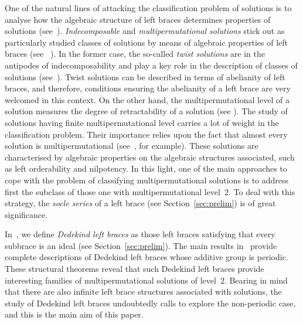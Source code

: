 \documentclass[12pt, a4paper, english]{article}
\theoremstyle{definition}
\begin{document}
One of the natural lines of attacking the classification problem of solutions is to analyse how the algebraic structure of left braces determines properties of solutions (see~\cite{Rump07}). \emph{Indecomposable} and \emph{multipermutational solutions}  stick out as particularly studied classes of solutions by means of algebraic properties of left braces (see ~\cite{CedoJespersOkninski10, CedoJespersOkninski14, CedoOkninski23, Gateva-IvanovaCameron12, Gateva-Ivanova18-advmath, JedlickaPilitowska23, Smoktunowicz18-tams}). In the former case, the so-called \emph{twist solutions} are in the antipodes of indecomposability and play a key role in the description of classes of solutions (see~\cite{BachillerCedoJespersOkninski19, BallesterEstebanJimenezPerezC24-solubleskewbraces}). Twist solutions can be described in terms of abelianity of left braces, and therefore, conditions ensuring the abelianity of a left brace are very welcomed in this context. On the other hand, the multipermutational level of a solution measures the degree of retractability of a solution (see \cite{EtingofSchedlerSoloviev99}). The study of solutions having finite multipermutational level carries a lot of weight in the classification problem. Their importance relies upon the fact that almost every solution is multipermutational (see~\cite{JespersVanAntwerpenVendramin23}, for example). These solutions are characterised by algebraic properties on the algebraic structures associated, such as left orderability and nilpotency. In this light, one of the main approaches to cope with the problem of classifying multipermutational solutions is to address first the subclass of those one with multipermutational level~$2$. To deal with this strategy, the \emph{socle series} of a left brace (see Section~\ref{sec:prelim}) is of great significance. 

In~\cite{BallesterEstebanKurdachenkoPerezC-dedekind-leftbraces}, we define \emph{Dedekind left braces} as those left braces satisfying that every subbrace is an ideal (see Section~\ref{sec:prelim}). The main results in~\cite{BallesterEstebanKurdachenkoPerezC-dedekind-leftbraces} provide complete descriptions of Dedekind left braces whose additive group is periodic. These structural theorems reveal that such Dedekind left braces provide interesting families of multipermutational solutions of level~$2$.  Bearing in mind that there are also infinite left brace structures associated with solutions, the study of Dedekind left braces undoubtedly calls to explore the non-periodic case, and this is the main aim of this paper. 
\end{document}
